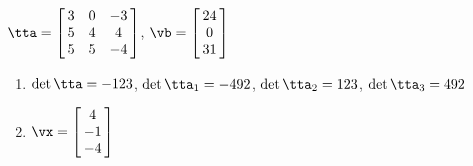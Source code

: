{$\tta = \left[\hskip -3pt \begin{array}{ccc} 3&0&-3\\  5&4&4
\\  5&5&-4\end{array}\hskip -3pt \right]$,
 \quad
$\vb = \left[\hskip -3pt \begin{array}{c} 24\\  0\\  
31\end{array}\hskip -3pt \right] $}
{\begin{enumerate}
\item	$\det{\tta} = -123$, $\det{\tta_1} = -492$, $\det{\tta_2} = 123$, $\det{\tta_3} = 492$
\item $\vx = \left[\hskip -3pt \begin{array}{c} 4\\  -1\\  -4\end{array}\hskip -3pt \right]$
\end{enumerate}
}

